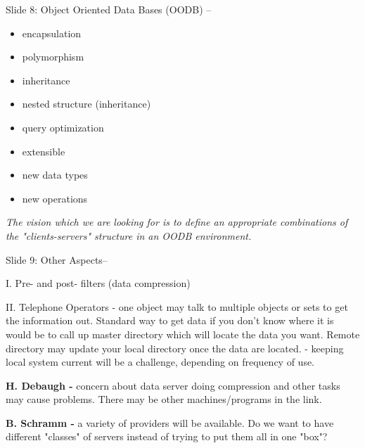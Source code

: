 \begin{description}
\item{Slide 8:} Object Oriented Data Bases (OODB) --
	\begin{itemize}
		\item encapsulation
		\item polymorphism
		\item inheritance
		\item nested structure (inheritance)
		\item query optimization
		\item extensible
		\item new data types
		\item new operations
	\end{itemize}

{\em The vision which we are looking for is to define an appropriate 
combinations of the "clients-servers" structure in an OODB environment.}
\normalsize

\begin{figure}[h]
\centerline{}
\end{figure}
\clearpage
\item{Slide 9:} Other Aspects--
	\begin{description}
		\item{I.} Pre- and post- filters  (data compression)

		\item{II.} Telephone Operators - one object may talk to
multiple objects or sets to get the information out.  Standard way to get
data if you don't know where it is would be to call up master directory
which will locate the data you want.  Remote directory may update your local
directory once the data are located. - keeping local system current will be a
challenge, depending on frequency of use.
		\end{description}

\begin{figure}[h]
\centerline{}
\end{figure}
\clearpage
\end{description}

\medskip
{\bf H. Debaugh -} concern about data server doing compression and other tasks 
may cause problems.  There may be other machines/programs in the link.

\medskip
{\bf B. Schramm -} a variety of providers will be available.  Do we want to
have  different "classes" of servers instead of trying to put them all in one 
"box"?  

